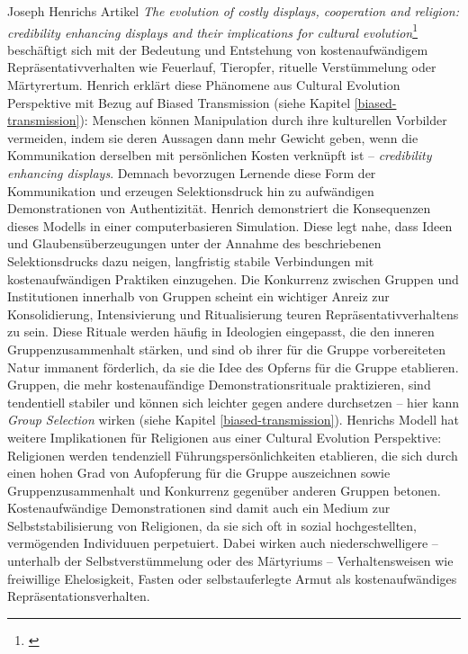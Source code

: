 \documentclass[openany,twoside,twocolumn]{book}
\let\rmarkdownfootnote\footnote%
\def\footnote{\protect\rmarkdownfootnote}
\begin{document}
Joseph Henrichs Artikel \emph{The evolution of costly displays,
cooperation and religion: credibility enhancing displays and their
implications for cultural evolution}\footnote{\textcite{henrich_evolution_2009}}
beschäftigt sich mit der Bedeutung und Entstehung von kostenaufwändigem
Repräsentativverhalten wie Feuerlauf, Tieropfer, rituelle Verstümmelung
oder Märtyrertum. Henrich erklärt diese Phänomene aus Cultural Evolution
Perspektive mit Bezug auf Biased Transmission (siehe Kapitel
\ref{biased-transmission}): Menschen können Manipulation durch ihre
kulturellen Vorbilder vermeiden, indem sie deren Aussagen dann mehr
Gewicht geben, wenn die Kommunikation derselben mit persönlichen Kosten
verknüpft ist -- \emph{credibility enhancing displays}. Demnach
bevorzugen Lernende diese Form der Kommunikation und erzeugen
Selektionsdruck hin zu aufwändigen Demonstrationen von Authentizität.
Henrich demonstriert die Konsequenzen dieses Modells in einer
computerbasieren Simulation. Diese legt nahe, dass Ideen und
Glaubensüberzeugungen unter der Annahme des beschriebenen
Selektionsdrucks dazu neigen, langfristig stabile Verbindungen mit
kostenaufwändigen Praktiken einzugehen. Die Konkurrenz zwischen Gruppen
und Institutionen innerhalb von Gruppen scheint ein wichtiger Anreiz zur
Konsolidierung, Intensivierung und Ritualisierung teuren
Repräsentativverhaltens zu sein. Diese Rituale werden häufig in
Ideologien eingepasst, die den inneren Gruppenzusammenhalt stärken, und
sind ob ihrer für die Gruppe vorbereiteten Natur immanent förderlich, da
sie die Idee des Opferns für die Gruppe etablieren. Gruppen, die mehr
kostenaufändige Demonstrationsrituale praktizieren, sind tendentiell
stabiler und können sich leichter gegen andere durchsetzen -- hier kann
\emph{Group Selection} wirken (siehe Kapitel \ref{biased-transmission}).
Henrichs Modell hat weitere Implikationen für Religionen aus einer
Cultural Evolution Perspektive: Religionen werden tendenziell
Führungspersönlichkeiten etablieren, die sich durch einen hohen Grad von
Aufopferung für die Gruppe auszeichnen sowie Gruppenzusammenhalt und
Konkurrenz gegenüber anderen Gruppen betonen. Kostenaufwändige
Demonstrationen sind damit auch ein Medium zur Selbststabilisierung von
Religionen, da sie sich oft in sozial hochgestellten, vermögenden
Individuuen perpetuiert. Dabei wirken auch niederschwelligere --
unterhalb der Selbstverstümmelung oder des Märtyriums --
Verhaltensweisen wie freiwillige Ehelosigkeit, Fasten oder
selbstauferlegte Armut als kostenaufwändiges Repräsentationsverhalten.
\end{document}
